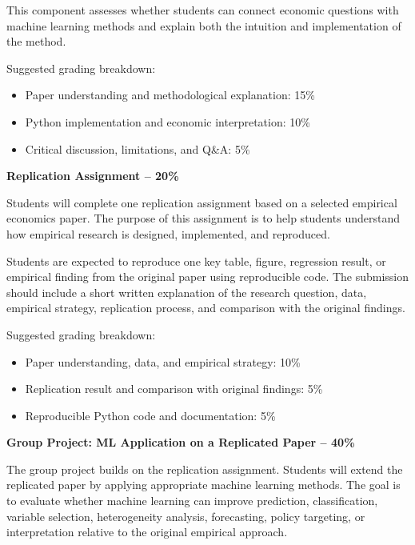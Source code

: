 \documentclass[11pt]{article}
\begin{document}
This component assesses whether students can connect economic questions with machine learning methods and explain both the intuition and implementation of the method.

\vspace{4pt}
\noindent Suggested grading breakdown:
\begin{itemize}[leftmargin=1.5em]
    \item Paper understanding and methodological explanation: 15\%
    \item Python implementation and economic interpretation: 10\%
    \item Critical discussion, limitations, and Q\&A: 5\%
\end{itemize}

\noindent \textbf{Replication Assignment -- 20\%}

Students will complete one replication assignment based on a selected empirical economics paper. The purpose of this assignment is to help students understand how empirical research is designed, implemented, and reproduced.

Students are expected to reproduce one key table, figure, regression result, or empirical finding from the original paper using reproducible code. The submission should include a short written explanation of the research question, data, empirical strategy, replication process, and comparison with the original findings.

\vspace{4pt}
\noindent Suggested grading breakdown:
\begin{itemize}[leftmargin=1.5em]
    \item Paper understanding, data, and empirical strategy: 10\%
    \item Replication result and comparison with original findings: 5\%
    \item Reproducible Python code and documentation: 5\%
\end{itemize}

\noindent \textbf{Group Project: ML Application on a Replicated Paper -- 40\%}

The group project builds on the replication assignment. Students will extend the replicated paper by applying appropriate machine learning methods. The goal is to evaluate whether machine learning can improve prediction, classification, variable selection, heterogeneity analysis, forecasting, policy targeting, or interpretation relative to the original empirical approach.
\end{document}
